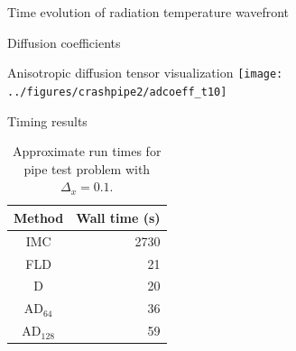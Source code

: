 \documentclass{beamer}
\begin{document}
\begin{frame}{Time evolution of radiation temperature wavefront}
  \centering%
  \par
\end{frame}
\begin{frame}{Diffusion coefficients}
  \centering%
  \par
\end{frame}
\begin{frame}{Anisotropic diffusion tensor visualization}
  \centering%
  \texttt{[image: ../figures/crashpipe2/adcoeff\_t10]}%
  \par
\end{frame}
\begin{frame}{Timing results}
  \begin{table}[htb]
    \centering
    \begin{tabular}{cr}
      Method & Wall time (s) \\ \hline
      IMC & 2730 \\
      FLD & 21 \\
      D   & 20 \\
      AD$_{64}$ & 36 \\
      AD$_{128}$ & 59
    \end{tabular}
    \caption{Approximate run times for pipe test problem with $\Delta_x=0.1$.}
    \label{tab:pipeTiming}
  \end{table}
\end{frame}

\end{document}
